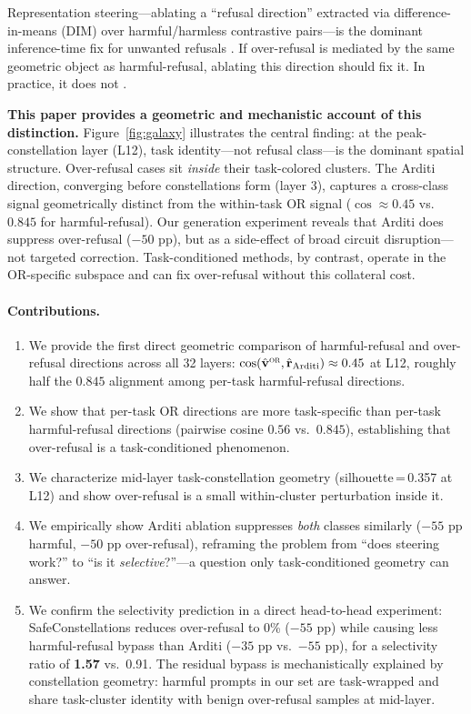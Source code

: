 \documentclass[11pt]{article}
\newcommand{\OR}{\textsc{or}}                        %
\begin{document}
Representation steering---ablating a ``refusal direction'' extracted via
difference-in-means (DIM) over harmful/harmless contrastive pairs---is the dominant
inference-time fix for unwanted refusals \citep{arditi2024refusal,zou2023representation}.
If over-refusal is mediated by the same geometric object as harmful-refusal, ablating
this direction should fix it. In practice, it does not \citep{wangf2025refusal}.

\textbf{This paper provides a geometric and mechanistic account of this distinction.}
Figure~\ref{fig:galaxy} illustrates the central finding: at the peak-constellation
layer (L12), task identity---not refusal class---is the dominant spatial structure.
Over-refusal cases sit \emph{inside} their task-colored clusters. The Arditi direction,
converging before constellations form (layer 3), captures a cross-class signal
geometrically distinct from the within-task OR signal ($\cos \approx 0.45$ vs.\
$0.845$ for harmful-refusal). Our generation experiment reveals that Arditi does
suppress over-refusal ($-50$ pp), but as a side-effect of broad circuit disruption---not
targeted correction. Task-conditioned methods, by contrast, operate in the
OR-specific subspace and can fix over-refusal without this collateral cost.

\paragraph{Contributions.}
\begin{enumerate}
  \item We provide the first direct geometric comparison of harmful-refusal and
  over-refusal directions across all 32 layers:
  $\cos(\hat{\mathbf{v}}^{\OR}, \hat{\mathbf{r}}_{\text{Arditi}}) \approx 0.45$
  at L12, roughly half the $0.845$ alignment among per-task harmful-refusal directions.
  \item We show that per-task OR directions are more task-specific than per-task
  harmful-refusal directions (pairwise cosine $0.56$ vs.\ $0.845$), establishing
  that over-refusal is a task-conditioned phenomenon.
  \item We characterize mid-layer task-constellation geometry (silhouette\,=\,0.357 at
  L12) and show over-refusal is a small within-cluster perturbation inside it.
  \item We empirically show Arditi ablation suppresses \emph{both} classes similarly
  ($-55$ pp harmful, $-50$ pp over-refusal), reframing the problem from ``does steering
  work?'' to ``is it \emph{selective}?''---a question only task-conditioned geometry
  can answer.
  \item We confirm the selectivity prediction in a direct head-to-head experiment:
  SafeConstellations reduces over-refusal to 0\% ($-55$ pp) while causing less
  harmful-refusal bypass than Arditi ($-35$ pp vs.\ $-55$ pp), for a selectivity
  ratio of \textbf{1.57} vs.\ 0.91. The residual bypass is mechanistically explained
  by constellation geometry: harmful prompts in our set are task-wrapped and share
  task-cluster identity with benign over-refusal samples at mid-layer.
\end{enumerate}
\end{document}
